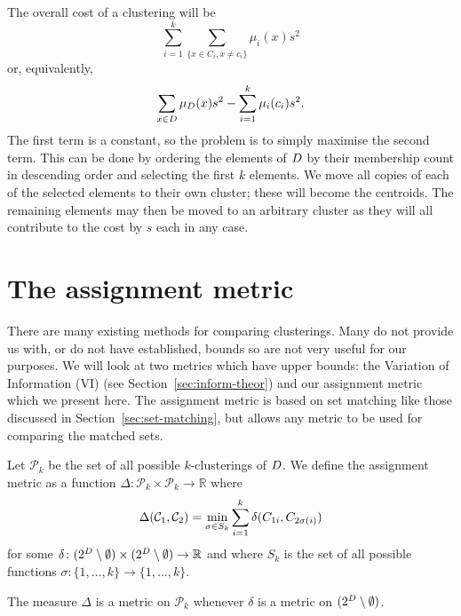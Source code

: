 The overall cost of a clustering will be
\begin{equation*}
  \sum_{i=1}^{k} \sum_{\{x \in C_i,x \neq c_i\}} \mu_{i}(x)s^2
\end{equation*}
or, equivalently,
\begin{equation*}
  \sum_{x \in D} \mu_{D}(x)s^2 - \sum_{i=1}^{k} \mu_{i}(c_i)s^2.
\end{equation*}
The first term is a constant, so the problem is to simply maximise the second
term.  This can be done by ordering the elements of $D$ by their
membership count in descending order and selecting the first $k$ elements.  We
move all copies of each of the selected elements to their own cluster; these
will become the centroids.  The remaining elements may then be moved to an
arbitrary cluster as they will all contribute to the cost by $s$ each in any
case.

\section{The assignment metric}
\label{sec:metr-comp-clust}

There are many existing methods for comparing clusterings.  Many do not
provide us with, or do not have established, bounds so are not very useful for
our purposes.  We will look at two metrics which have upper bounds: the
Variation of Information (VI) (see Section~\ref{sec:inform-theor}) and our
assignment metric which we present here.  The assignment metric is based on
set matching like those discussed in Section~\ref{sec:set-matching}, but
allows any metric to be used for comparing the matched sets.

Let $\mathcal{P}_k$ be the set of all possible $k$-clusterings of $D$.
We define the assignment metric as a function $\Delta \colon \mathcal{P}_k
\!\times \mathcal{P}_k \to \mathbb{R}$ where
\begin{equation*}
  \Delta(\mathcal{C}_1, \mathcal{C}_2) = \min_{\sigma \in S_k} \sum_{i=1}^{k}
  \delta(C_{1i}, C_{2\sigma(i)})
\end{equation*}
for some $\delta \colon (2^{D} \setminus \emptyset) \times (2^{D}
\setminus \emptyset) \to \mathbb{R}$ and where $S_k$ is the set of all
possible functions $\sigma \colon \{1, \dotsc, k\} \to \{1, \dotsc, k\}$.

\begin{thm}
  The measure $\Delta$ is a metric on $\mathcal{P}_k$ whenever $\delta$ is a
  metric on $(2^{D} \setminus \emptyset)$.
\end{thm}

